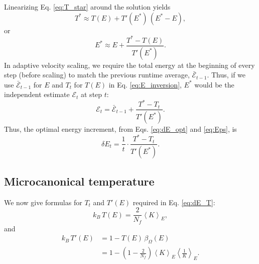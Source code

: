 \documentclass[reprint]{revtex4-1}
\begin{document}
Linearizing Eq. \eqref{eq:T_star} around the solution
yields
%
\begin{equation*}
T^*
\approx
T( E )
+
T'( E^* ) \, ( E^* - E )
,
\end{equation*}
%
or
%
\begin{equation}
E^*
\approx
E
+
\frac{ T^* - T(E) }
     { T'(E^*) }
.
\label{eq:E_inversion}
\end{equation}
%
In adaptive velocity scaling,
we require the total energy at the beginning of every step
(before scaling) to match the previous runtime average,
$\bar{\mathcal E}_{t - 1}$.
%
Thus, if we use $\bar{\mathcal E}_{t - 1}$ for $E$
and $T_t$ for $T(E)$
in Eq. \eqref{eq:E_inversion},
$E^*$ would be the independent estimate
$\mathcal E_{t}$ at step $t$:
%
%
\begin{equation}
\mathcal E_t
=
\bar{\mathcal E}_{t - 1}
+
\frac{ T^* - T_t }
     { T'(E^*) }
.
\label{eq:Eps}
\end{equation}
%
Thus, the optimal energy increment,
from Eqs. \eqref{eq:dE_opt} and \eqref{eq:Eps},
is
%
\begin{equation}
\delta E_t
=
\frac{ 1 } { t }
\cdot
\frac{ T^* - T_t }
     { T'(E^*) }
.
\label{eq:dE_T}
\end{equation}
%



\subsection{Microcanonical temperature}


We now give formulas for $T_t$
and $T'(E)$ required in Eq. \eqref{eq:dE_T}:
%
%
\begin{equation}
  k_B \, T(E)
  =
  \frac{ 2 } { N_f }
  \left\langle
    K
  \right\rangle_E
  ,
  \label{eq:TE_K}
\end{equation}
%
and
%
\begin{align}
  k_B \, T'(E)
  &=
  1
  -
  T(E) \, \beta_\Omega(E)
  \\
  &=
  1
  -
  \left(
    1 - \frac{2}{N_f}
  \right)
  \left\langle
  K
  \right\rangle_E
  \left\langle
    \frac 1 K
  \right\rangle_E
  .
  \label{eq:dTdE}
\end{align}
%
\end{document}
